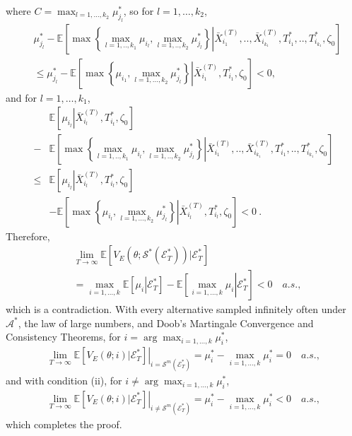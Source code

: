 \documentclass[journal]{IEEEtran}
\begin{document}
\begin{IEEEproof}
                  where $C=\max_{l=1,\ldots,k_2}\mu_{j_{l}}^{*}$, so for $l=1,\ldots,k_2$,\small
                  \begin{align*}
                  &\mu_{j_{l}}^{*}-\left.\mathbb{E}\left[ \max\left\{ \max_{l=1,..,k_1} \mu_{i_{l}},\max_{l=1,..,k_2}\mu_{j_{l}}^{*}\right \}\right|\bar{X}_{i_1}^{(T)},..,\bar{X}_{i_{k_1}}^{(T)},T^{*}_{i_{1}},..,T^{*}_{i_{k_1}},\zeta_0\right]\\
                  &\leq \mu_{j_{l}}^{*}-\left.\mathbb{E}\left[ \max\left\{  \mu_{i_{1}},\max_{l=1,\ldots,k_2}\mu_{j_{l}}^{*}\right \}\right|\bar{X}_{i_1}^{(T)},T^{*}_{i_{1}},\zeta_0\right]<0,
                  \end{align*}\normalsize
                  and for $l=1,\ldots,k_1$, 
                  \small
                          \begin{align*}
                          &\mathbb{E}\left[\mu_{i_{l}}\left|\bar{X}_{i_l}^{(T)}\right.,T_{i_t}^{*},\zeta_0\right]\\
                          -&\left.\mathbb{E}\left[ \max\left\{ \max_{l=1,..,k_1} \mu_{i_{l}},\max_{l=1,..,k_2}\mu_{j_{l}}^{*}\right \}\right|\bar{X}_{i_1}^{(T)},..,\bar{X}_{i_{k_1}}^{(T)},T^{*}_{i_{1}},..,T^{*}_{i_{k_1}},\zeta_0\right]\\
                          \leq &\mathbb{E}\left[\mu_{i_{l}}\left|\bar{X}_{i_l}^{(T)}\right.,T_{i_l}^{*},\zeta_0\right]\\
                          &-\left.\mathbb{E}\left[ \max\left\{  \mu_{i_{l}},\max_{l=1,\ldots,k_2}\mu_{j_{l}}^{*}\right \}\right|\bar{X}_{i_l}^{(T)},T^{*}_{i_{l}},\zeta_0\right]<0~.
                          \end{align*}\normalsize
                  Therefore, 
             \begin{align*}
             &\lim_{T\to\infty}\mathbb{E}\left[ V_{E}(\theta;\mathcal{S}^{*}(\mathcal{E}_T^{*}))|\mathcal{E}_T^{*}\right]\\
             &=\max_{i=1,\ldots,k}\mathbb{E}\left[\mu_{i}\left|\mathcal{E}_T^{*}\right.\right]-\mathbb{E}\left.\left[\max_{i=1,\ldots,k}\mu_{i}\right|\mathcal{E}_T^{*}\right]<0\quad a.s.,\end{align*}  
             which is a contradiction.  With every alternative sampled infinitely often under $\mathcal{A}^{*}$, the law of large numbers, and Doob's Martingale Convergence and Consistency Theorems, for $i=\arg\max_{i=1,\ldots,k}\mu_i^{*}$, 
                \begin{align*}\lim_{T\to\infty}\left.\mathbb{E}\left[ V_{E}(\theta;i)|\mathcal{E}_T^{*}\right]\right|_{i=\mathcal{S}^m(\mathcal{E}_T^{*})}=\mu_i^{*}-\max_{i=1,\ldots,k}\mu_i^{*}=0\quad a.s.,\end{align*}  
                and with condition (ii), for $i\neq \arg\max_{i=1,\ldots,k}\mu_i^{*}$, 
                 \begin{align*}\lim_{T\to\infty}\left.\mathbb{E}\left[ V_{E}(\theta;i)|\mathcal{E}_T^{*}\right]\right|_{i\neq \mathcal{S}^m(\mathcal{E}_T^{*})}=\mu_i^{*}-\max_{i=1,\ldots,k}\mu_i^{*}<0\quad a.s.,\end{align*}
                 which completes the proof. 
               \end{IEEEproof}
\end{document}
